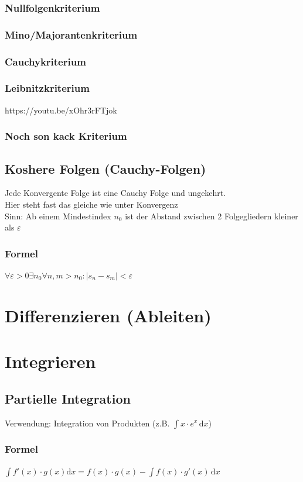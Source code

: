 \documentclass[a4paper,portrait]{scrartcl}
\begin{document}
\subsubsection{Nullfolgenkriterium}
\subsubsection{Mino/Majorantenkriterium}
\subsubsection{Cauchykriterium}
\subsubsection{Leibnitzkriterium}
https://youtu.be/xOhr3rFTjok
\subsubsection{Noch son kack Kriterium}
\subsection{Koshere Folgen (Cauchy-Folgen)}
Jede Konvergente Folge ist eine Cauchy Folge und ungekehrt.\\
Hier steht fast das gleiche wie unter Konvergenz\\
Sinn: Ab einem Mindestindex $n_0$ ist der Abstand zwischen 2 Folgegliedern kleiner als $\varepsilon$
\subsubsection*{Formel}
$ \forall \varepsilon > 0 \exists n_0 \forall n,m > n_0: |s_n - s_m| < \varepsilon$

\section{Differenzieren (Ableiten)}

\section{Integrieren}
\subsection{Partielle Integration}
Verwendung: Integration von Produkten (z.B. $ \int \! x \cdot e^x \, \mathrm{d}x $)
\subsubsection*{Formel}
$ \int f'(x) \cdot g(x) \mathrm{d}x = f(x) \cdot g(x) - \int f(x) \cdot g'(x) \, \mathrm{d}x$
\end{document}
